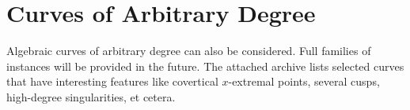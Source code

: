 {\section{Curves of Arbitrary Degree\label{bi_sec:Arrangement2AlgebraicCurve2}}

Algebraic curves of arbitrary degree can also be considered. Full families
of instances will be provided in the future. The attached archive
lists selected curves that have interesting features like covertical 
$x$-extremal points, several cusps, high-degree singularities, et cetera.


}
